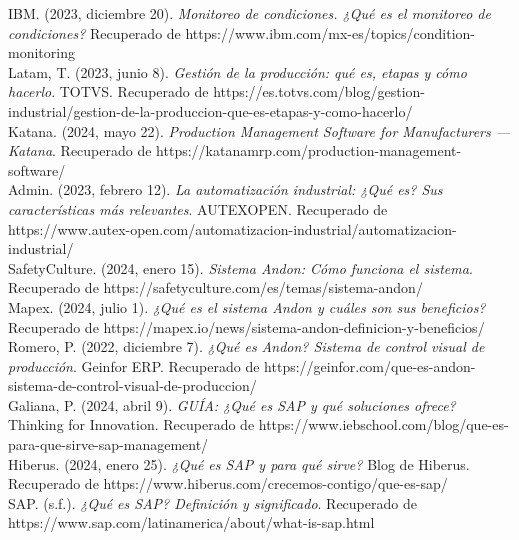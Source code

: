 \documentclass[12pt,letterpaper,spanish, xcolor=table]{report}
\begin{document}
	IBM. (2023, diciembre 20). \textit{Monitoreo de condiciones. ¿Qué es el monitoreo de condiciones?} Recuperado de {https://www.ibm.com/mx-es/topics/condition-monitoring}\\
	
	Latam, T. (2023, junio 8). \textit{Gestión de la producción: qué es, etapas y cómo hacerlo}. TOTVS. Recuperado de {https://es.totvs.com/blog/gestion-industrial/gestion-de-la-produccion-que-es-etapas-y-como-hacerlo/}\\
	
	Katana. (2024, mayo 22). \textit{Production Management Software for Manufacturers — Katana}. Recuperado de {https://katanamrp.com/production-management-software/}\\
	
	Admin. (2023, febrero 12). \textit{La automatización industrial: ¿Qué es? Sus características más relevantes}. AUTEXOPEN. Recuperado de {https://www.autex-open.com/automatizacion-industrial/automatizacion-industrial/}\\
	
	SafetyCulture. (2024, enero 15). \textit{Sistema Andon: Cómo funciona el sistema}. Recuperado de {https://safetyculture.com/es/temas/sistema-andon/}\\
	
	Mapex. (2024, julio 1). \textit{¿Qué es el sistema Andon y cuáles son sus beneficios?} Recuperado de {https://mapex.io/news/sistema-andon-definicion-y-beneficios/}\\
	
	Romero, P. (2022, diciembre 7). \textit{¿Qué es Andon? Sistema de control visual de producción}. Geinfor ERP. Recuperado de {https://geinfor.com/que-es-andon-sistema-de-control-visual-de-produccion/}\\
	
	Galiana, P. (2024, abril 9). \textit{GUÍA: ¿Qué es SAP y qué soluciones ofrece?} Thinking for Innovation. Recuperado de {https://www.iebschool.com/blog/que-es-para-que-sirve-sap-management/}\\
	
	Hiberus. (2024, enero 25). \textit{¿Qué es SAP y para qué sirve?} Blog de Hiberus. Recuperado de {https://www.hiberus.com/crecemos-contigo/que-es-sap/}\\
	
	SAP. (s.f.). \textit{¿Qué es SAP? Definición y significado}. Recuperado de {https://www.sap.com/latinamerica/about/what-is-sap.html}\\
	
\end{document}
